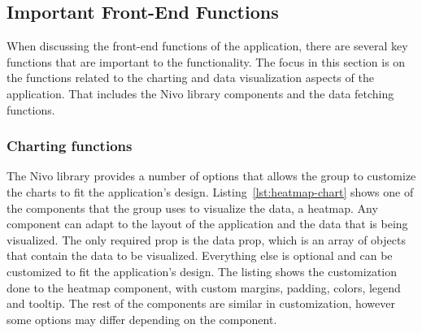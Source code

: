 \subsection{Important Front-End Functions}\label{subsec:important-front-end-functions}

When discussing the front-end functions of the application, there are several key functions that are important to the
functionality.
The focus in this section is on the functions related to the charting and data visualization aspects of the application.
That includes the Nivo library components and the data fetching functions.

\subsubsection{Charting functions}\label{subsubsec:charting-functions}

The Nivo library provides a number of options that allows the group to customize the charts to fit the application's
design.
Listing~\ref{lst:heatmap-chart} shows one of the components that the group uses to visualize the data, a heatmap.
Any component can adapt to the layout of the application and the data that is being visualized.
The only required prop is the data prop, which is an array of objects that contain the data to be visualized.
Everything else is optional and can be customized to fit the application's design.
The listing shows the customization done to the heatmap component, with custom margins, padding, colors, legend and
tooltip.
The rest of the components are similar in customization, however some options may differ depending on the component.

